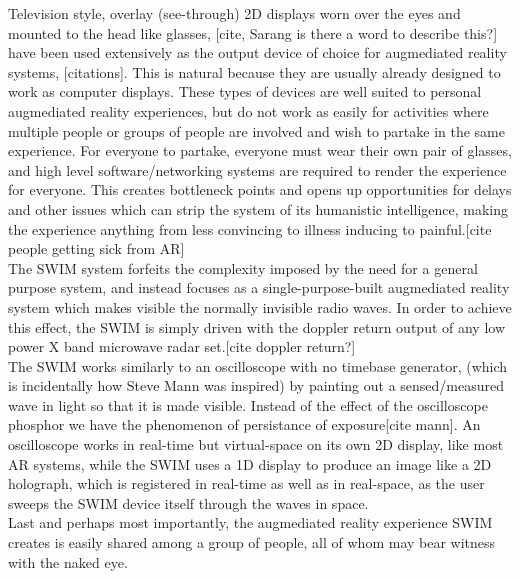 \documentclass[conference]{IEEEtran}
\begin{document}
Television style, overlay (see-through) 2D displays worn over the eyes and mounted to the head like glasses, [cite, Sarang is there a word to describe this?] have been used extensively as the output device of choice for augmediated reality systems, [citations]. This is natural because they are usually already designed to work as computer displays. These types of devices are well suited to personal augmediated reality experiences, but do not work as easily for activities where multiple people or groups of people are involved and wish to partake in the same experience. For everyone to partake, everyone must wear their own pair of glasses, and high level software/networking systems are required to render the experience for everyone. This creates bottleneck points and opens up opportunities for delays and other issues which can strip the system of its humanistic intelligence, making the experience anything from less convincing to illness inducing to painful.[cite people getting sick from AR] \\ 
The SWIM system forfeits the complexity imposed by the need for a general purpose system, and instead focuses as a single-purpose-built augmediated reality system which makes visible the normally invisible radio waves. In order to achieve this effect, the SWIM is simply driven with the doppler return output of any low power X band microwave radar set.[cite doppler return?] \\
The SWIM works similarly to an oscilloscope with no timebase generator, (which is incidentally how Steve Mann was inspired) by painting out a sensed/measured wave in light so that it is made visible. Instead of the effect of the oscilloscope phosphor we have the phenomenon of persistance of exposure[cite mann]. An oscilloscope works in real-time but virtual-space on its own 2D display, like most AR systems, while the SWIM uses a 1D display to produce an image like a 2D holograph, which is registered in real-time as well as in real-space, as the user sweeps the SWIM device itself through the waves in space. \\
Last and perhaps most importantly, the augmediated reality experience SWIM creates is easily shared among a group of people, all of whom may bear witness with the naked eye.
\end{document}
